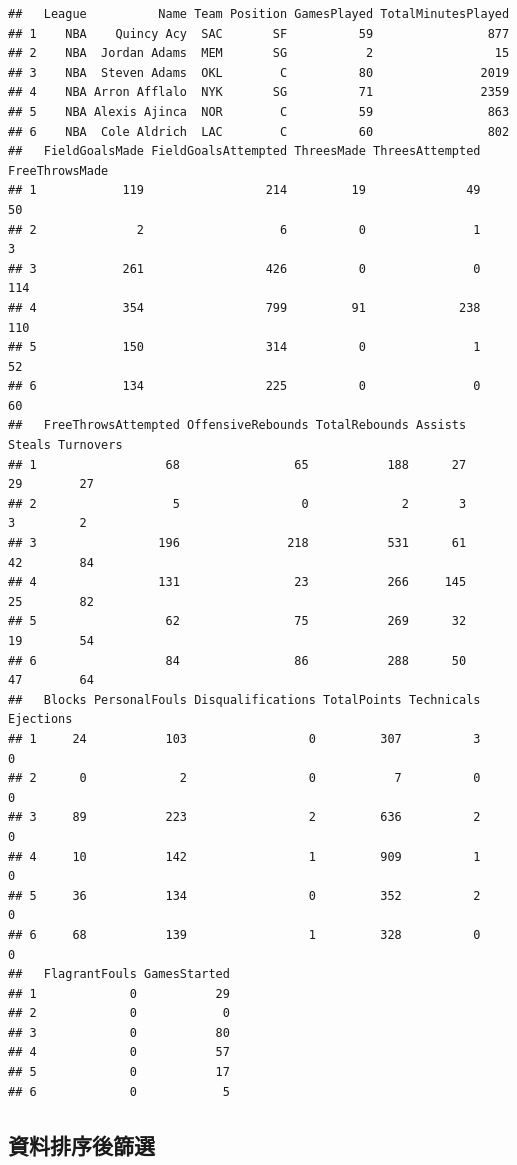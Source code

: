 \documentclass[]{book}
\theoremstyle{definition}
\theoremstyle{definition}
\theoremstyle{remark}
\begin{document}
\begin{verbatim}
##   League          Name Team Position GamesPlayed TotalMinutesPlayed
## 1    NBA    Quincy Acy  SAC       SF          59                877
## 2    NBA  Jordan Adams  MEM       SG           2                 15
## 3    NBA  Steven Adams  OKL        C          80               2019
## 4    NBA Arron Afflalo  NYK       SG          71               2359
## 5    NBA Alexis Ajinca  NOR        C          59                863
## 6    NBA  Cole Aldrich  LAC        C          60                802
##   FieldGoalsMade FieldGoalsAttempted ThreesMade ThreesAttempted FreeThrowsMade
## 1            119                 214         19              49             50
## 2              2                   6          0               1              3
## 3            261                 426          0               0            114
## 4            354                 799         91             238            110
## 5            150                 314          0               1             52
## 6            134                 225          0               0             60
##   FreeThrowsAttempted OffensiveRebounds TotalRebounds Assists Steals Turnovers
## 1                  68                65           188      27     29        27
## 2                   5                 0             2       3      3         2
## 3                 196               218           531      61     42        84
## 4                 131                23           266     145     25        82
## 5                  62                75           269      32     19        54
## 6                  84                86           288      50     47        64
##   Blocks PersonalFouls Disqualifications TotalPoints Technicals Ejections
## 1     24           103                 0         307          3         0
## 2      0             2                 0           7          0         0
## 3     89           223                 2         636          2         0
## 4     10           142                 1         909          1         0
## 5     36           134                 0         352          2         0
## 6     68           139                 1         328          0         0
##   FlagrantFouls GamesStarted
## 1             0           29
## 2             0            0
## 3             0           80
## 4             0           57
## 5             0           17
## 6             0            5
\end{verbatim}

\subsection{資料排序後篩選}
\end{document}
